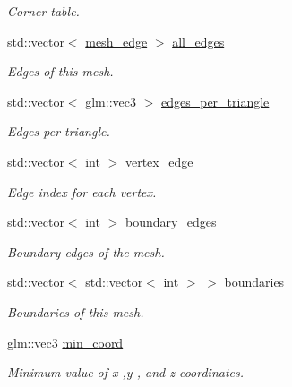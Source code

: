 \begin{DoxyCompactItemize}
\begin{DoxyCompactList}\small\item\em Corner table. \end{DoxyCompactList}\item 
std\+::vector$<$ \hyperlink{classgeoproc_1_1mesh__edge}{mesh\+\_\+edge} $>$ \hyperlink{classgeoproc_1_1TriangleMesh_ab10f052ad932cd78056a55b58ddd475c}{all\+\_\+edges}
\begin{DoxyCompactList}\small\item\em Edges of this mesh. \end{DoxyCompactList}\item 
std\+::vector$<$ glm\+::vec3 $>$ \hyperlink{classgeoproc_1_1TriangleMesh_a3bc5c41f4baeda69a72c5eda4ed3d699}{edges\+\_\+per\+\_\+triangle}
\begin{DoxyCompactList}\small\item\em Edges per triangle. \end{DoxyCompactList}\item 
std\+::vector$<$ int $>$ \hyperlink{classgeoproc_1_1TriangleMesh_abbc25699f67776fc99c909124b0c584a}{vertex\+\_\+edge}
\begin{DoxyCompactList}\small\item\em Edge index for each vertex. \end{DoxyCompactList}\item 
std\+::vector$<$ int $>$ \hyperlink{classgeoproc_1_1TriangleMesh_a142a764ddf07b98c7efcd596d88c3f87}{boundary\+\_\+edges}
\begin{DoxyCompactList}\small\item\em Boundary edges of the mesh. \end{DoxyCompactList}\item 
std\+::vector$<$ std\+::vector$<$ int $>$ $>$ \hyperlink{classgeoproc_1_1TriangleMesh_a57162eac37831c87786a8dab8331d72f}{boundaries}
\begin{DoxyCompactList}\small\item\em Boundaries of this mesh. \end{DoxyCompactList}\item 
\mbox{\label{classgeoproc_1_1TriangleMesh_aab5e7d8baf6f6cd7b5655b4c89f79e00}} 
glm\+::vec3 \hyperlink{classgeoproc_1_1TriangleMesh_aab5e7d8baf6f6cd7b5655b4c89f79e00}{min\+\_\+coord}
\begin{DoxyCompactList}\small\item\em Minimum value of x-\/,y-\/, and z-\/coordinates. \end{DoxyCompactList}\item 

\end{DoxyCompactItemize}
